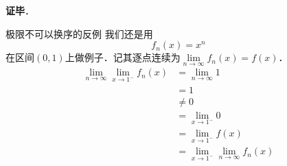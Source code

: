 \textbf{证毕}．



\begin{example}{极限不可以换序的反例}
我们还是用
\begin{equation}
f_n(x)=x^n
\end{equation}
在区间$(0, 1)$上做例子．记其逐点连续为$\lim\limits_{n\to\infty}f_n(x)=f(x)$．
\begin{equation}
\begin{aligned}
\lim\limits_{n\to\infty}\lim\limits_{x\to 1^-}f_n(x)&=\lim\limits_{n\to\infty}1\\
&=1\\
&\not=0\\
&=\lim\limits_{x\to 1^-} 0\\
&=\lim\limits_{x\to 1^-}f(x)\\
&=\lim\limits_{x\to 1^-}\lim\limits_{n\to\infty}f_n(x)
\end{aligned}
\end{equation}
\end{example}


















